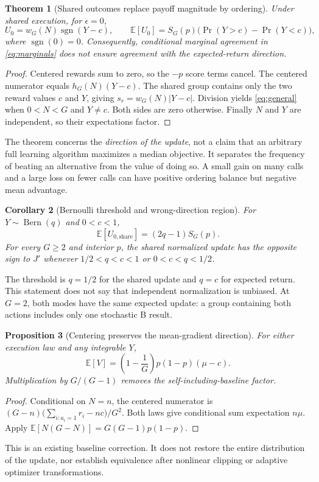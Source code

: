 \documentclass[10pt,letterpaper]{article}
\newtheorem{theorem}{Theorem}
\newtheorem{proposition}[theorem]{Proposition}
\newtheorem{corollary}[theorem]{Corollary}
\newcommand{\E}{\mathbb{E}}
\newcommand{\Bern}{\operatorname{Bern}}
\newcommand{\sgn}{\operatorname{sgn}}
\newcommand{\shr}{\mathrm{share}}
\begin{document}
\begin{theorem}[Shared outcomes replace payoff magnitude by ordering]
Under shared execution, for $\epsilon=0$,
\begin{equation}
U_0=w_G(N)\sgn(Y-c),\qquad
\E[U_0]=S_G(p)\bigl(\Pr(Y>c)-\Pr(Y<c)\bigr),
\label{eq:general}
\end{equation}
where $\sgn(0)=0$. Consequently, conditional marginal agreement in
\eqref{eq:marginals} does not ensure agreement with the expected-return direction.
\end{theorem}
\begin{proof}
Centered rewards sum to zero, so the $-p$ score terms cancel. The centered
numerator equals $h_G(N)(Y-c)$. The shared group contains only the two reward
values $c$ and $Y$, giving $s_r=w_G(N)|Y-c|$. Division yields
\eqref{eq:general} when $0<N<G$ and $Y\ne c$. Both sides are zero otherwise.
Finally $N$ and $Y$ are independent, so their expectations factor.
\end{proof}

The theorem concerns the \emph{direction of the update}, not a claim that an
arbitrary full learning algorithm maximizes a median objective. It separates
the frequency of beating an alternative from the value of doing so. A small
gain on many calls and a large loss on fewer calls can have positive ordering
balance but negative mean advantage.

\begin{corollary}[Bernoulli threshold and wrong-direction region]
For $Y\sim\Bern(q)$ and $0<c<1$,
\begin{equation}
\E[U_{0,\shr}]=(2q-1)S_G(p).
\label{eq:bernoulli}
\end{equation}
For every $G\geq2$ and interior $p$, the shared normalized update has the
opposite sign to $J'$ whenever $1/2<q<c<1$ or $0<c<q<1/2$.
\end{corollary}
The threshold is $q=1/2$ for the shared update and $q=c$ for expected return.
This statement does not say that independent normalization is unbiased.
At $G=2$, both modes have the same expected update: a group containing both
actions includes only one stochastic B result.

\begin{proposition}[Centering preserves the mean-gradient direction]
For either execution law and any integrable $Y$,
\begin{equation}
\E[V]=\left(1-\frac1G\right)p(1-p)(\mu-c).
\label{eq:centeredmean}
\end{equation}
Multiplication by $G/(G-1)$ removes the self-including-baseline factor.
\end{proposition}
\begin{proof}
Conditional on $N=n$, the centered numerator is
$(G-n)\bigl(\sum_{i:a_i=1}r_i-nc\bigr)/G^2$. Both laws give conditional sum
expectation $n\mu$. Apply $\E[N(G-N)]=G(G-1)p(1-p)$.
\end{proof}
This is an existing baseline correction. It does not restore the entire
distribution of the update, nor establish equivalence after nonlinear clipping
or adaptive optimizer transformations.
\end{document}
